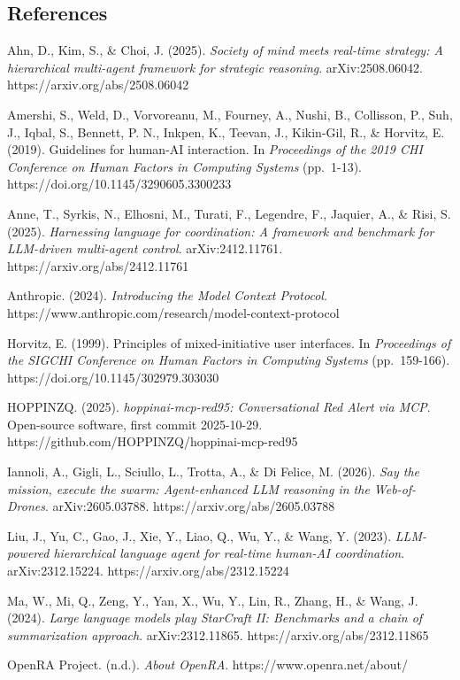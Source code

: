 \documentclass[
  journal]{IEEEtran}
\begin{document}
\subsection{References}\label{references}

Ahn, D., Kim, S., \& Choi, J. (2025). \emph{Society of mind meets
real-time strategy: A hierarchical multi-agent framework for strategic
reasoning}. arXiv:2508.06042. https://arxiv.org/abs/2508.06042

Amershi, S., Weld, D., Vorvoreanu, M., Fourney, A., Nushi, B.,
Collisson, P., Suh, J., Iqbal, S., Bennett, P. N., Inkpen, K., Teevan,
J., Kikin-Gil, R., \& Horvitz, E. (2019). Guidelines for human-AI
interaction. In \emph{Proceedings of the 2019 CHI Conference on Human
Factors in Computing Systems} (pp.~1-13).
https://doi.org/10.1145/3290605.3300233

Anne, T., Syrkis, N., Elhosni, M., Turati, F., Legendre, F., Jaquier,
A., \& Risi, S. (2025). \emph{Harnessing language for coordination: A
framework and benchmark for LLM-driven multi-agent control}.
arXiv:2412.11761. https://arxiv.org/abs/2412.11761

Anthropic. (2024). \emph{Introducing the Model Context Protocol}.
https://www.anthropic.com/research/model-context-protocol

Horvitz, E. (1999). Principles of mixed-initiative user interfaces. In
\emph{Proceedings of the SIGCHI Conference on Human Factors in Computing
Systems} (pp.~159-166). https://doi.org/10.1145/302979.303030

HOPPINZQ. (2025). \emph{hoppinai-mcp-red95: Conversational Red Alert via
MCP}. Open-source software, first commit 2025-10-29.
https://github.com/HOPPINZQ/hoppinai-mcp-red95

Iannoli, A., Gigli, L., Sciullo, L., Trotta, A., \& Di Felice, M.
(2026). \emph{Say the mission, execute the swarm: Agent-enhanced LLM
reasoning in the Web-of-Drones}. arXiv:2605.03788.
https://arxiv.org/abs/2605.03788

Liu, J., Yu, C., Gao, J., Xie, Y., Liao, Q., Wu, Y., \& Wang, Y. (2023).
\emph{LLM-powered hierarchical language agent for real-time human-AI
coordination}. arXiv:2312.15224. https://arxiv.org/abs/2312.15224

Ma, W., Mi, Q., Zeng, Y., Yan, X., Wu, Y., Lin, R., Zhang, H., \& Wang,
J. (2024). \emph{Large language models play StarCraft II: Benchmarks and
a chain of summarization approach}. arXiv:2312.11865.
https://arxiv.org/abs/2312.11865

OpenRA Project. (n.d.). \emph{About OpenRA}.
https://www.openra.net/about/
\end{document}
